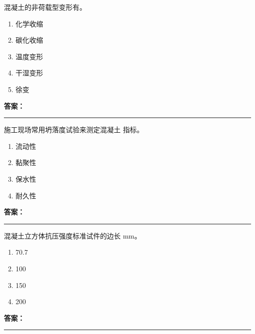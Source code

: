 \documentclass[UTF8,fontset=fandol,11pt]{ctexart}
\newcommand{\answerline}{\textcolor{answerred}{\rule{2.4cm}{0.7pt}}}
\begin{document}
\begin{quizbox}[title={乱序第 141 题｜第四章混凝土结构工程}]

混凝土的非荷载型变形有。\\

\begin{enumerate}[label=\Alph*.]

\item 化学收缩

\item 碳化收缩

\item 温度变形

\item 干湿变形

\item 徐变

\end{enumerate}

\textbf{\textcolor{answerred}{答案：}} \answerline

\end{quizbox}

\vspace{0.2em}

\begin{quizbox}[title={乱序第 142 题｜第四章混凝土结构工程}]

施工现场常用坍落度试验来测定混凝土 指标。\\

\begin{enumerate}[label=\Alph*.]

\item 流动性

\item 黏聚性

\item 保水性

\item 耐久性

\end{enumerate}

\textbf{\textcolor{answerred}{答案：}} \answerline

\end{quizbox}

\vspace{0.2em}

\begin{quizbox}[title={乱序第 143 题｜第四章混凝土结构工程}]

混凝土立方体抗压强度标准试件的边长 mm。\\

\begin{enumerate}[label=\Alph*.]

\item 70.7

\item 100

\item 150

\item 200

\end{enumerate}

\textbf{\textcolor{answerred}{答案：}} \answerline

\end{quizbox}
\end{document}
